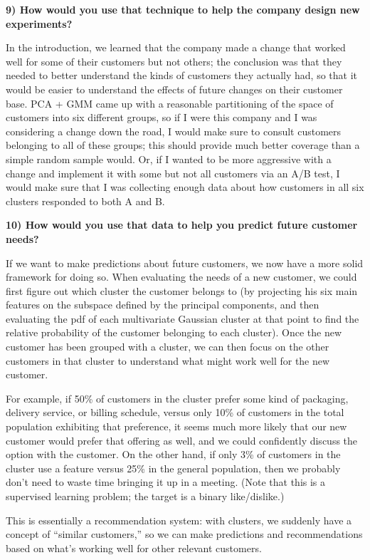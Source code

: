 \documentclass{article}
\begin{document}
    \textbf{9) How would you use that technique to help the company design
new experiments?}

    In the introduction, we learned that the company made a change that
worked well for some of their customers but not others; the conclusion
was that they needed to better understand the kinds of customers they
actually had, so that it would be easier to understand the effects of
future changes on their customer base. PCA + GMM came up with a
reasonable partitioning of the space of customers into six different
groups, so if I were this company and I was considering a change down
the road, I would make sure to consult customers belonging to all of
these groups; this should provide much better coverage than a simple
random sample would. Or, if I wanted to be more aggressive with a change
and implement it with some but not all customers via an A/B test, I
would make sure that I was collecting enough data about how customers in
all six clusters responded to both A and B.

    \textbf{10) How would you use that data to help you predict future
customer needs?}

    If we want to make predictions about future customers, we now have a
more solid framework for doing so. When evaluating the needs of a new
customer, we could first figure out which cluster the customer belongs
to (by projecting his six main features on the subspace defined by the
principal components, and then evaluating the pdf of each multivariate
Gaussian cluster at that point to find the relative probability of the
customer belonging to each cluster). Once the new customer has been
grouped with a cluster, we can then focus on the other customers in that
cluster to understand what might work well for the new customer.

For example, if 50\% of customers in the cluster prefer some kind of
packaging, delivery service, or billing schedule, versus only 10\% of
customers in the total population exhibiting that preference, it seems
much more likely that our new customer would prefer that offering as
well, and we could confidently discuss the option with the customer. On
the other hand, if only 3\% of customers in the cluster use a feature
versus 25\% in the general population, then we probably don't need to
waste time bringing it up in a meeting. (Note that this is a supervised
learning problem; the target is a binary like/dislike.)

This is essentially a recommendation system: with clusters, we suddenly
have a concept of ``similar customers,'' so we can make predictions and
recommendations based on what's working well for other relevant
customers.


    
    
    
    
\end{document}
